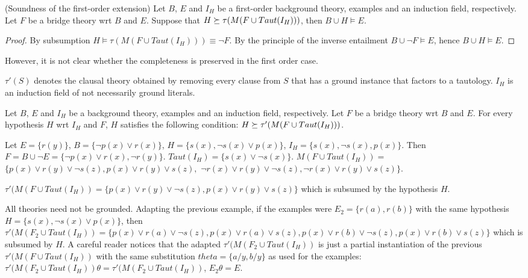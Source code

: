 \begin{proposition}(Soundness of the first-order extension)
Let $B$, $E$ and $I_H$ be a first-order background theory, examples and an induction field, respectively. Let $F$ be a bridge theory wrt $B$ and $E$. Suppose that $H \succeq \tau(M(F \cup Taut(I_H)))$, then $B \cup H \models E$.
\end{proposition}
\begin{proof}
By subsumption $H \models \tau(M(F \cup Taut(I_H))) \equiv \neg F$. By the principle of the inverse entailment $B \cup \neg F \models E$, hence
$B \cup H \models E$.
\end{proof}

However, it is not clear whether the completeness is preserved in the first order case.

$\tau'(S)$ denotes the clausal theory obtained by removing every clause from $S$ that has a ground instance that factors to a tautology. $I_H$ is an induction field of not necessarily ground literals.

\begin{conjecture}\label{subsumptionConjectureFirstOrder}
Let $B$, $E$ and $I_H$ be a background theory, examples and an induction field, respectively. Let $F$ be a bridge theory wrt $B$ and $E$. For every hypothesis $H$ wrt $I_H$ and $F$, $H$ satisfies the following condition:
$H \succeq \tau'(M(F \cup Taut(I_H)))$.
\end{conjecture}

\begin{exmp}
Let $E=\{r(y)\}$,
$B=\{\neg p(x) \vee r(x)\}$,
$H=\{s(x), \neg s(x) \vee p(x)\}$,
$I_H=\{s(x), \neg s(x), p(x)\}$.
Then $F=B \cup \neg E=\{\neg p(x) \vee r(x), \neg r(y) \}$.
$Taut(I_H)=\{s(x) \vee \neg s(x)\}$.
$M(F \cup Taut(I_H))=$
$\{p(x) \vee r(y) \vee \neg s(z), p(x) \vee r(y) \vee s(z),$
$\neg r(x) \vee r(y) \vee \neg s(z),\neg r(x) \vee r(y) \vee s(z) \}$.

$\tau'(M(F \cup Taut(I_H))=\{p(x) \vee r(y) \vee \neg s(z), p(x) \vee r(y) \vee s(z)\}$ which is subsumed by the hypothesis $H$.
\end{exmp}

\begin{exmp}
All theories need not be grounded. Adapting the previous example, if the examples were
$E_2=\{r(a), r(b)\}$ with the same hypothesis
$H=\{s(x), \neg s(x) \vee p(x)\}$, then
$\tau'(M(F_2 \cup Taut(I_H))=\{p(x) \vee r(a) \vee \neg s(z), p(x) \vee r(a) \vee s(z), p(x) \vee r(b) \vee \neg s(z), p(x) \vee r(b) \vee s(z) \}$ which is subsumed by $H$. A careful reader notices that the adapted $\tau'(M(F_2 \cup Taut(I_H))$ is just a partial instantiation of the previous
$\tau'(M(F \cup Taut(I_H))$ with the same substitution
$theta=\{a / y, b / y\}$ as used for the examples:
$\tau'(M(F_2 \cup Taut(I_H)) \theta=\tau'(M(F_2 \cup Taut(I_H))$,
$E_2 \theta = E$.
\end{exmp}

